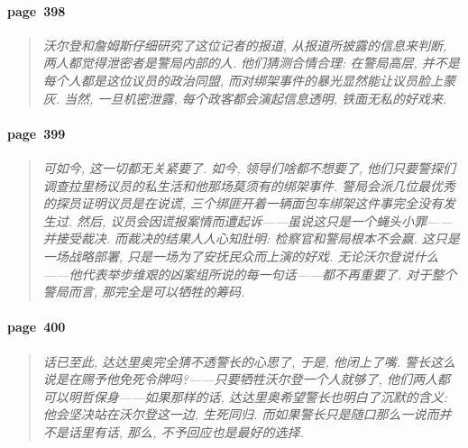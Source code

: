 \paragraph*{page~398}
\begin{quotation}
    \itshape
    沃尔登和詹姆斯仔细研究了这位记者的报道, 从报道所披露的信息来判断, 两人都觉得泄密者是警局内部的人. 他们猜测合情合理: 在警局高层, 并不是每个人都是这位议员的政治同盟, 而对绑架事件的暴光显然能让议员脸上蒙灰. 当然, 一旦机密泄露, 每个政客都会演起信息透明, 铁面无私的好戏来.  
\end{quotation}

\paragraph*{page~399}
\begin{quotation}
    \itshape
    可如今, 这一切都无关紧要了. 如今, 领导们啥都不想要了, 他们只要警探们调查拉里杨议员的私生活和他那场莫须有的绑架事件. 警局会派几位最优秀的探员证明议员是在说谎, 三个绑匪开着一辆面包车绑架这件事完全没有发生过. 然后, 议员会因谎报案情而遭起诉------虽说这只是一个蝇头小罪------并接受裁决. 而裁决的结果人人心知肚明: 检察官和警局根本不会赢. 这只是一场战略部署, 只是一场为了安抚民众而上演的好戏. 无论沃尔登说什么------他代表举步维艰的凶案组所说的每一句话------都不再重要了. 对于整个警局而言, 那完全是可以牺牲的筹码. 
\end{quotation}

\paragraph*{page~400}
\begin{quotation}
    \itshape
    话已至此, 达达里奥完全猜不透警长的心思了, 于是, 他闭上了嘴. 警长这么说是在赐予他免死令牌吗?------只要牺牲沃尔登一个人就够了, 他们两人都可以明哲保身------如果那样的话, 达达里奥希望警长也明白了沉默的含义: 他会坚决站在沃尔登这一边, 生死同归. 而如果警长只是随口那么一说而并不是话里有话, 那么, 不予回应也是最好的选择.  
\end{quotation}

